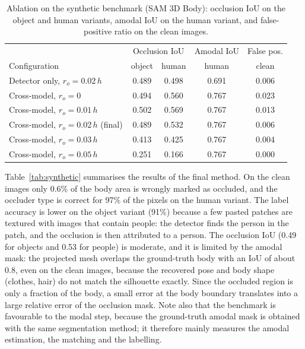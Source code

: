 \documentclass[11pt,a4paper]{article}
\begin{document}
\begin{table}[!h]
  \centering
  \caption{Ablation on the synthetic benchmark (SAM 3D Body): occlusion IoU on the object and human variants, amodal IoU on the human variant, and false-positive ratio on the clean images.}
  \label{tab:ablation}
  \begin{tabular}{lcccc}
    \toprule
    & \multicolumn{2}{c}{Occlusion IoU} & Amodal IoU & False pos. \\
    Configuration & object & human & human & clean \\
    \midrule
    Detector only, $r_o=0.02\,h$      & 0.489 & 0.498 & 0.691 & 0.006 \\
    Cross-model, $r_o=0$              & 0.494 & 0.560 & 0.767 & 0.023 \\
    Cross-model, $r_o=0.01\,h$        & 0.502 & 0.569 & 0.767 & 0.013 \\
    Cross-model, $r_o=0.02\,h$ (final) & 0.489 & 0.532 & 0.767 & 0.006 \\
    Cross-model, $r_o=0.03\,h$        & 0.413 & 0.425 & 0.767 & 0.004 \\
    Cross-model, $r_o=0.05\,h$        & 0.251 & 0.166 & 0.767 & 0.000 \\
    \bottomrule
  \end{tabular}
\end{table}

Table~\ref{tab:synthetic} summarises the results of the final method. On the clean images only 0.6\% of the body area is wrongly marked as occluded, and the occluder type is correct for 97\% of the pixels on the human variant. The label accuracy is lower on the object variant (91\%) because a few pasted patches are textured with images that contain people: the detector finds the person in the patch, and the occlusion is then attributed to a person. The occlusion IoU (0.49 for objects and 0.53 for people) is moderate, and it is limited by the amodal mask: the projected mesh overlaps the ground-truth body with an IoU of about 0.8, even on the clean images, because the recovered pose and body shape (clothes, hair) do not match the silhouette exactly. Since the occluded region is only a fraction of the body, a small error at the body boundary translates into a large relative error of the occlusion mask. Note also that the benchmark is favourable to the modal step, because the ground-truth amodal mask is obtained with the same segmentation method; it therefore mainly measures the amodal estimation, the matching and the labelling.
\end{document}
